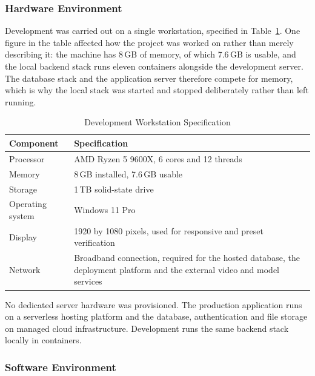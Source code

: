 \documentclass[12pt, oneside]{article} %
\newcommand{\tabbreak}{\hyphenpenalty=200\exhyphenpenalty=200\tolerance=4000\hbadness=10000\hspace{0pt}}
\begin{document}
\subsubsection{Hardware Environment}

Development was carried out on a single workstation, specified in Table~\ref{tab:dev_hardware}. One figure in the table affected how the project was worked on rather than merely describing it: the machine has 8\,GB of memory, of which 7.6\,GB is usable, and the local backend stack runs eleven containers alongside the development server. The database stack and the application server therefore compete for memory, which is why the local stack was started and stopped deliberately rather than left running.

\begin{table}[H]
\caption{Development Workstation Specification}
\label{tab:dev_hardware}
\vspace{-4mm}
\begin{center}
\renewcommand{\arraystretch}{1.25}
\footnotesize
\begin{tabular}{|>{\raggedright\arraybackslash\tabbreak}p{4.0cm}|>{\raggedright\arraybackslash\tabbreak}p{9.81cm}|}
\hline
\textbf{Component} & \textbf{Specification} \\
\hline \hline
Processor & AMD Ryzen 5 9600X, 6 cores and 12 threads \\ \hline
Memory & 8\,GB installed, 7.6\,GB usable \\ \hline
Storage & 1\,TB solid-state drive \\ \hline
Operating system & Windows 11 Pro \\ \hline
Display & 1920 by 1080 pixels, used for responsive and preset verification \\ \hline
Network & Broadband connection, required for the hosted database, the deployment platform and the external video and model services \\ \hline
\end{tabular}
\end{center}
\end{table}

No dedicated server hardware was provisioned. The production application runs on a serverless hosting platform and the database, authentication and file storage on managed cloud infrastructure. Development runs the same backend stack locally in containers.

\subsubsection{Software Environment}
\end{document}
